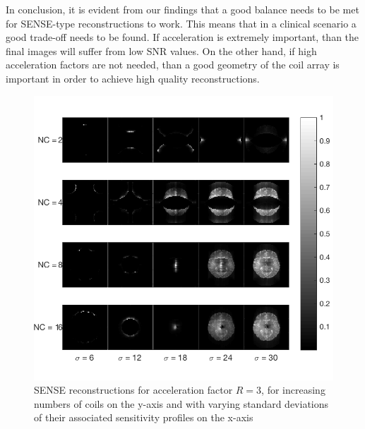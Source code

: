 
In conclusion, it is evident from our findings that a good balance needs to be met for SENSE-type reconstructions to work. This means that in a clinical scenario a good trade-off needs to be found. If acceleration is extremely important, than the final images will suffer from low SNR values. On the other hand, if high acceleration factors are not needed, than a good geometry of the coil array is important in order to achieve high quality reconstructions.


\begin{figure}[H]
    \centering
    \includegraphics[width=1\textwidth,keepaspectratio]{R3brainsb}
    \caption{SENSE reconstructions for acceleration factor $R = 3$, for increasing numbers of coils on the y-axis and with varying standard deviations of their associated sensitivity profiles on the x-axis}
    \label{fig:R3brains}
\end{figure}

